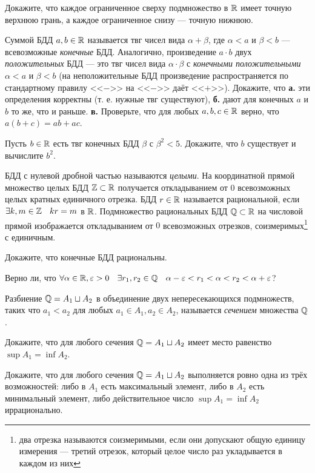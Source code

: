 \documentclass[a4paper, 12pt, num=26]{listok}
\begin{document}
\begin{problem}\label{completness}
	Докажите, что каждое ограниченное сверху подмножество в $\mathbb{R}$ имеет точную верхнюю грань,
	а каждое ограниченное снизу --- точную нижнюю.
\end{problem}
\begin{problem}
	Суммой БДД $a, b \in \mathbb{R}$ называется твг чисел вида $\alpha + \beta$,
	где $\alpha < a$ и $\beta < b$ --- всевозможные \textit{конечные} БДД.
	Аналогично, произведение $a\cdot b$ двух \textit{положительных} БДД --- это твг чисел вида
	$\alpha \cdot \beta$ с \textit{конечными положительными} $\alpha < a$ и $\beta < b$
	(на неположительные БДД произведение распространяется по стандартному правилу <<$-$>> на <<$-$>> даёт <<$+$>>).
	Докажите, что
	\textbf{а.} эти определения корректны (т. е. нужные твг существуют),
	\textbf{б.} дают для конечных $a$ и $b$ то же, что и раньше.
	\textbf{в.} Проверьте, что для любых $a, b, c \in \mathbb{R}$ верно, что $a(b + c) = ab + ac$.
\end{problem}
\begin{problem}[ (корни)]\label{roots}
	Пусть $b \in \mathbb{R}$ есть твг конечных БДД $\beta$ с $\beta^2 < 5$.
	Докажите, что $b$ существует и вычислите $b^2$.
\end{problem}
\begin{definition}
	БДД с нулевой дробной частью называются \textit{целыми}.
	На координатной прямой множество целых БДД $\mathbb{Z} \subset \mathbb{R}$ получается откладыванием от $0$ всевозможных целых кратных единичного отрезка.
	БДД $r \in \mathbb{R}$ называется рациональной, если $\exists{k,m \in \Z} kr = m$ в $\mathbb{R}$.
	Подмножество рациональных БДД $\mathbb{Q} \subset \mathbb{R}$ на числовой прямой изображается откладыванием от $0$ всевозможных отрезков,
	соизмеримых\footnote{два отрезка называются соизмеримыми, если они допускают общую единицу измерения --- третий отрезок,
	который целое число раз укладывается в каждом из них} с единичным.
\end{definition}
\begin{problem}
	Докажите, что конечные БДД рациональны.
\end{problem}
\begin{problem}
	Верно ли, что $\forall{\alpha \in \R, \epsilon > 0} \exists{r_1, r_2 \in \Q} \alpha - \epsilon < r_1 < \alpha < r_2 < \alpha + \epsilon$?
\end{problem}
\begin{definition}
	Разбиение $\mathbb{Q} = A_1 \sqcup A_2$ в объединение двух непересекающихся подмножеств,
	таких что $a_1 < a_2$ для любых $a_1 \in A_1, a_2 \in A_2$, называется \textit{сечением} множества $\mathbb{Q}$.
\end{definition}
\begin{problem}
	Докажите, что для любого сечения $\mathbb{Q} = A_1 \sqcup A_2$ имеет место равенство $\sup A_1 = \inf A_2$.
\end{problem}
\begin{problem}
	Докажите, что для любого сечения $\mathbb{Q} = A_1 \sqcup A_2$ выполняется ровно одна из трёх возможностей:
	либо в $A_1$ есть максимальный элемент, либо в $A_2$ есть минимальный элемент,
	либо действительное число $\sup A_1 = \inf A_2$ иррационально.
\end{problem}
\end{document}
